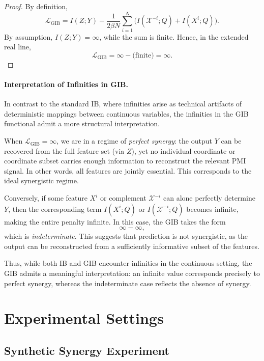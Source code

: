 \documentclass{article}
\theoremstyle{definition}
\theoremstyle{remark}
\begin{document}
\begin{proof}
By definition,
\[
\mathcal{L}_{\mathrm{GIB}}
=
I(Z;Y)
- 
\frac{1}{2\beta N}\sum_{i=1}^{N} 
\Big(I(\mathcal{X}^{-i}; Q) + I(X^{i}; Q)\Big).
\]
By assumption, $I(Z;Y)=\infty$, while the sum is finite. Hence,
in the extended real line,
\[
\mathcal{L}_{\mathrm{GIB}} = \infty - \text{(finite)} = \infty.
\]
\end{proof}


\paragraph{Interpretation of Infinities in GIB.}

In contrast to the standard IB, where infinities arise as technical artifacts of 
deterministic mappings between continuous variables, the infinities in the GIB 
functional admit a more structural interpretation.

When $\mathcal{L}_{\mathrm{GIB}}=\infty$, we are in a regime of \emph{perfect 
synergy}: the output $Y$ can be recovered from the full feature set (via $Z$), 
yet no individual coordinate or coordinate subset carries enough information to 
reconstruct the relevant PMI signal. In other words, all features are jointly 
essential. This corresponds to the ideal synergistic regime.

Conversely, if some feature $X^{i}$ or complement $\mathcal{X}^{-i}$ can alone 
perfectly determine $Y$, then the corresponding term $I(X^{i}; Q)$ or 
$I(\mathcal{X}^{-i}; Q)$ becomes infinite, making the entire penalty infinite. 
In this case, the GIB takes the form
\[
\infty - \infty,
\]
which is \emph{indeterminate}.  
This suggests that prediction is not synergistic, as the output can be reconstructed from a sufficiently informative subset of the features.

Thus, while both IB and GIB encounter infinities in the continuous setting, the 
GIB admits a meaningful interpretation: an infinite value corresponds precisely 
to perfect synergy, whereas the indeterminate case reflects the absence of 
synergy.


\section{Experimental Settings}

\subsection{Synthetic Synergy Experiment}
\label{app:synthetic}
\end{document}
